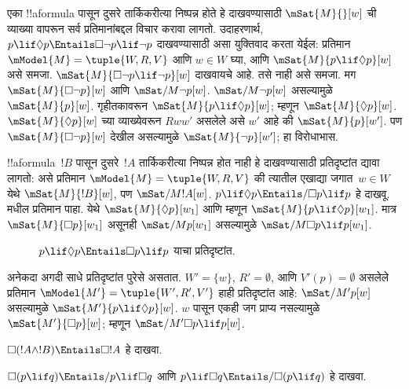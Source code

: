 \documentclass[../../../include/open-logic-section]{subfiles}
\begin{document}
\begin{ex}
  एका !!a{formula} पासून दुसरे तार्किकरीत्या निष्पन्न होते हे
  दाखवण्यासाठी $\mSat{M}{}[w]$ ची व्याख्या वापरून सर्व
  प्रतिमानांबद्दल विचार करावा लागतो. उदाहरणार्थ,
  $p \lif \Diamond p \Entails \Box\lnot p \lif \lnot p$
  दाखवण्यासाठी असा युक्तिवाद करता येईल: प्रतिमान
  $\mModel{M} = \tuple{W, R,
    V}$ आणि $w \in W$ घ्या, आणि $\mSat{M}{p \lif \Diamond
    p}[w]$ असे समजा. $\mSat{M}{\Box\lnot p \lif \lnot
    p}[w]$ दाखवायचे आहे. तसे नाही असे समजा. मग
  $\mSat{M}{\Box\lnot p}[w]$ आणि $\mSat/{M}{\lnot p}[w]$.
  $\mSat/{M}{\lnot p}[w]$ असल्यामुळे $\mSat{M}{
    p}[w]$. गृहीतकावरून $\mSat{M}{p \lif \Diamond p}[w]$;
  म्हणून $\mSat{M}{\Diamond p}[w]$.
  $\mSat{M}{\Diamond
    p}[w]$ च्या व्याख्येवरून $Rww'$ असलेले असे $w'$
  आहे की $\mSat{M}{p}[w']$. पण $\mSat{M}{\Box \lnot p}[w]$
  देखील असल्यामुळे $\mSat{M}{\lnot p}[w']$; हा विरोधाभास.

  !!a{formula}~$!B$ पासून दुसरे~$!A$ तार्किकरीत्या
  निष्पन्न होत नाही हे दाखवण्यासाठी प्रतिदृष्टांत द्यावा
  लागतो: असे प्रतिमान $\mModel{M} = \tuple{W, R,
    V}$ की त्यातील एखाद्या जगात~$w \in W$ येथे
  $\mSat{M}{!B}[w]$, पण $\mSat/{M}{!A}[w]$.
  $p \lif \Diamond p \Entails/
  \Box p \lif p$ हे दाखवू.  मधील
  प्रतिमान पाहा. येथे $\mSat{M}{\Diamond p}[w_1]$
  आणि म्हणून $\mSat{M}{p \lif
    \Diamond p}[w_1]$. मात्र $\mSat{M}{\Box p}[w_1]$
  असूनही $\mSat/{M}{p}[w_1]$ असल्यामुळे
  $\mSat/{M}{\Box p \lif p}[w_1]$.
  \begin{figure}
  \begin{center}
  \end{center}
  \caption{$p \lif \Diamond p
  \Entails \Box p \lif p$ याचा प्रतिदृष्टांत.}
  \end{figure}

  अनेकदा अगदी साधे प्रतिदृष्टांत पुरेसे असतात.
  $W' = \{w\}$, $R' = \emptyset$, आणि $V'(p) =
  \emptyset$ असलेले प्रतिमान $\mModel{M'} =
  \tuple{W', R', V'}$ हाही प्रतिदृष्टांत आहे:
  $\mSat/{M'}{p}[w]$ असल्यामुळे
  $\mSat{M'}{p \lif \Diamond p}[w]$. $w$ पासून एकही
  जग प्राप्य नसल्यामुळे $\mSat{M'}{\Box p}[w]$; म्हणून
  $\mSat/{M'}{\Box p
    \lif p}[w]$.
\end{ex}

\begin{prob}
  $\Box (!A \land !B) \Entails \Box !A$ हे दाखवा.
\end{prob}

\begin{prob}
  $\Box (p \lif q) \Entails/ p \lif \Box q$ आणि $p \lif \Box
  q \Entails/\Box (p \lif q)$ हे दाखवा.
\end{prob}
\end{document}
